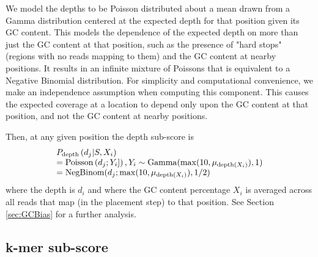 \documentclass[phd,tocprelim]{cornell}
\begin{document}
We model the depths to be Poisson distributed about a mean drawn from a Gamma distribution centered at the expected depth for that position given its GC content. This models the dependence of the expected depth on more than just the GC content at that position, such as the presence of "hard stops" (regions with no reads mapping to them) and the GC content at nearby positions. It results in an infinite mixture of Poissons that is equivalent to a Negative Binomial distribution. For simplicity and computational convenience, we make an independence assumption when computing this component.  This causes the expected coverage at a location to depend only upon the GC content at that position, and not the GC content at nearby positions.

Then, at any given position the depth sub-score is
\begin{equation}
    \begin{array}{l}
        P_{\text{depth}}\left(d_{j}|S,X_{i}\right) \\
        = {\rm Poisson}\left(d_{j};Y_{i}]\right), Y_{i} \sim {\rm Gamma}(\max(10,\mu_{\text{depth}(X_{i})}), 1) \\
        = {\rm NegBinom}(d_{j}; \max(10, \mu_{\text{depth}(X_{i})}), 1/2)
    \end{array}
\end{equation}
where the depth is $d_{i}$ and where the GC content percentage $X_{i}$ is averaged across all reads that map (in the placement step) to that position. See Section \ref{sec:GCBias} for a further analysis.


\subsection{k-mer sub-score} %
\label{sub:kmersubscore}
\end{document}
